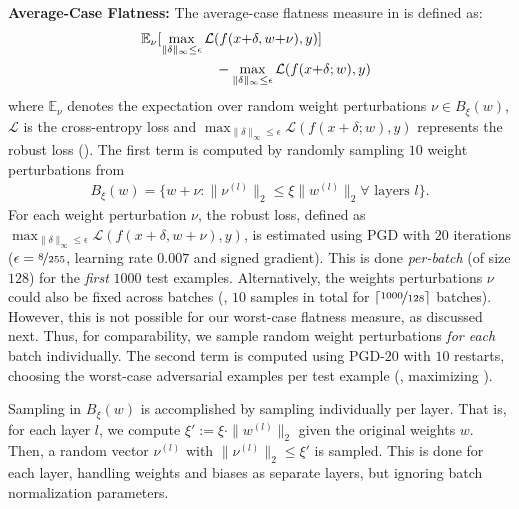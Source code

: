 \textbf{Average-Case Flatness:}
%
The average-case flatness measure in \RCE is defined as:
\begin{align}
	\hspace*{-0.2cm}\begin{split}
		\mathbb{E}_{\nu}[\max\limits_{\|\delta\|_\infty \leq \epsilon} \mathcal{L}(f(x{+}\delta, w{+}\nu), y)]\text{\hphantom{aaaaaaa}}\\
		\text{\hphantom{aaaaaaa}}- \max\limits_{\|\delta\|_\infty \leq \epsilon} \mathcal{L}(f(x{+}\delta;w), y)
	\end{split}\label{eq:supp-average}
\end{align}
where $\mathbb{E}_{\nu}$ denotes the expectation over random weight perturbations $\nu \in B_\xi(w)$, $\mathcal{L}$ is the cross-entropy loss and $\max_{\|\delta\|_\infty \leq \epsilon}\mathcal{L}(f(x{+}\delta;w), y)$ represents the robust loss (\RCE). The first term is computed by randomly sampling $10$ weight perturbations from
\begin{align}
	B_\xi(w) = \{w + \nu : \|\nu^{(l)}\|_2 \leq \xi \|w^{(l)}\|_2 \forall\text{ layers }l\}.\label{eq:supp-ball}
\end{align}
For each weight perturbation $\nu$, the robust loss, defined as $\max_{\|\delta\|_\infty \leq \epsilon} \mathcal{L}(f(x{+}\delta, w{+}\nu), y)$, is estimated using PGD with $20$ iterations ($\epsilon = \nicefrac{8}{255}$, learning rate $0.007$ and signed gradient). This is done \emph{per-batch} (of size $128$) for the \emph{first} $1000$ test examples. Alternatively, the weights perturbations $\nu$ could also be fixed across batches (\ie, $10$ samples in total for $\lceil\nicefrac{1000}{128}\rceil$ batches). However, this is not possible for our worst-case flatness measure, as discussed next. Thus, for comparability, we sample random weight perturbations \emph{for each} batch individually. The second term is computed using PGD-$20$ with $10$ restarts, choosing the worst-case adversarial examples per test example (\ie, maximizing \RCE).

Sampling in $B_\xi(w)$ is accomplished by sampling individually per layer. That is, for each layer $l$, we compute $\xi' := \xi \cdot \|w^{(l)}\|_2$ given the original weights $w$. Then, a random vector $\nu^{(l)}$ with $\|\nu^{(l)}\|_2 \leq \xi'$ is sampled. This is done for each layer, handling weights and biases as separate layers, but ignoring batch normalization \cite{IoffeICML2015} parameters.

